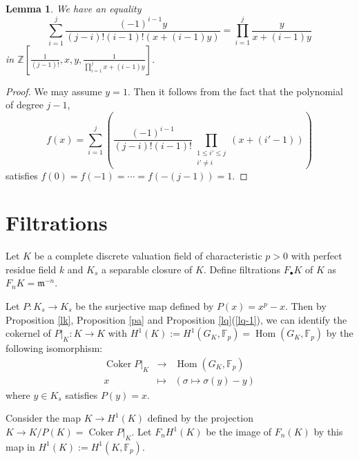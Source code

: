 \documentclass[10pt,a4paper]{amsart}
\numberwithin{equation}{section}
\theoremstyle{plain}
\newtheorem{lemm}[theo]{Lemma}
\theoremstyle{definition}
\begin{document}
\begin{lemm}\label{laf}
  We have an equality
  \begin{equation}
  \sum_{i=1}^j\frac{(-1)^{i-1}y}{(j-i)!(i-1)!(x+(i-1)y)}=\prod_{i=1}^{j}\frac{y}{x+(i-1)y}
  \end{equation}
  in $\displaystyle{\mathbb{Z}\left[\frac{1}{(j-1)!},x,y,\frac{1}{\prod_{i=1}^{j}x+(i-1)y}\right]}$.
  \end{lemm}

\begin{proof}
  We may assume $y=1$. Then it follows from the fact that the polynomial of degree $j-1$,
  \begin{equation}
  f(x)=\sum_{i=1}^j\left(\frac{(-1)^{i-1}}{(j-i)!(i-1)!}\prod_{\substack{1\leq i'\leq j\\i'\neq i }}(x+(i'-1))\right)
  \end{equation}
   satisfies $f(0)=f(-1)=\cdots=f(-(j-1))=1$. 
\end{proof}














\section{Filtrations}\label{sb}

Let $K$ be a complete discrete valuation field of characteristic $p>0$ with perfect residue field $k$ and $K_s$ a separable closure of $K$. Define filtrations $F_\bullet K$ of $K$ as $F_nK={\mathfrak{m}}^{-n}$. 

Let $P:K_s\to K_s$ be the surjective map defined by $P(x)=x^p-x$. Then by Proposition \ref{lk}, Proposition \ref{pa} and Proposition \ref{lq}(\ref{lq-1}), we can identify the cokernel of $P|_K:K\to K$ with $H^1(K):=H^1(G_K,\mathbb{F}_p)=\operatorname{Hom}(G_K,\mathbb{F}_p)$ by the following isomorphism:
\begin{equation}
\begin{array}{ccc}
  \operatorname{Coker}P|_K&\to&\operatorname{Hom}(G_K,\mathbb{F}_p)\\
  x&\mapsto&(\sigma\mapsto \sigma(y)-y) 
\end{array}
\end{equation}
where $y\in K_s$ satisfies $P(y)=x$. 

Consider the map $K\to H^1(K)$ defined by the projection $K\to K/P(K)=\operatorname{Coker}P|_K$. Let $F_nH^1(K)$ be the image of $F_n(K)$ by this map in $H^1(K):=H^1(K,\mathbb{F}_p)$.
\end{document}
